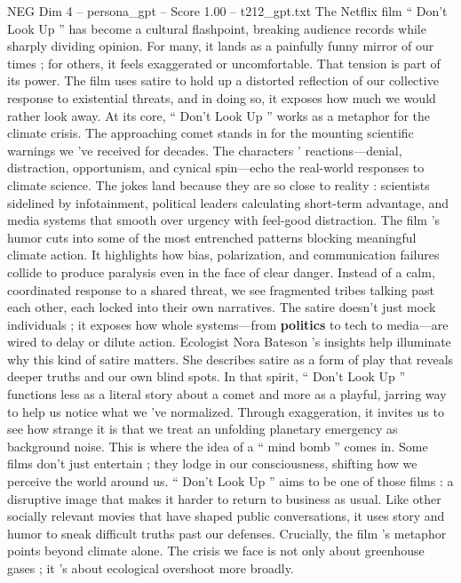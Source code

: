 \begin{textsample}{NEG Dim 4 – persona\_gpt – Score 1.00 – t212\_gpt.txt}  \label{ex:f4_neg_037}
The Netflix film “ Don't Look Up ” has become a cultural flashpoint, breaking audience records while sharply dividing opinion.
For many, it lands as a painfully funny mirror of our times ; for others, it feels exaggerated or uncomfortable.
That tension is part of its power.
The film uses satire to hold up a distorted reflection of our collective response to existential threats, and in doing so, it exposes how much we would rather look away.
At its core, “ Don't Look Up ” works as a metaphor for the climate crisis.
The approaching comet stands in for the mounting scientific warnings we ’ve received for decades.
The characters ’ reactions—denial, distraction, opportunism, and cynical spin—echo the real-world responses to climate science.
The jokes land because they are so close to reality : scientists sidelined by infotainment, political leaders calculating short-term advantage, and media systems that smooth over urgency with feel-good distraction.
The film ’s humor cuts into some of the most entrenched patterns blocking meaningful climate action.
It highlights how bias, polarization, and communication failures collide to produce paralysis even in the face of clear danger.
Instead of a calm, coordinated response to a shared threat, we see fragmented tribes talking past each other, each locked into their own narratives.
The satire doesn't just mock individuals ; it exposes how whole systems—from \textbf{politics} to tech to media—are wired to delay or dilute action.
Ecologist Nora Bateson ’s insights help illuminate why this kind of satire matters.
She describes satire as a form of play that reveals deeper truths and our own blind spots.
In that spirit, “ Don't Look Up ” functions less as a literal story about a comet and more as a playful, jarring way to help us notice what we ’ve normalized.
Through exaggeration, it invites us to see how strange it is that we treat an unfolding planetary emergency as background noise.
This is where the idea of a “ mind bomb ” comes in.
Some films don't just entertain ; they lodge in our consciousness, shifting how we perceive the world around us. “ Don't Look Up ” aims to be one of those films : a disruptive image that makes it harder to return to business as usual.
Like other socially relevant movies that have shaped public conversations, it uses story and humor to sneak difficult truths past our defenses.
Crucially, the film ’s metaphor points beyond climate alone.
The crisis we face is not only about greenhouse gases ; it ’s about ecological overshoot more broadly.

\end{textsample}
